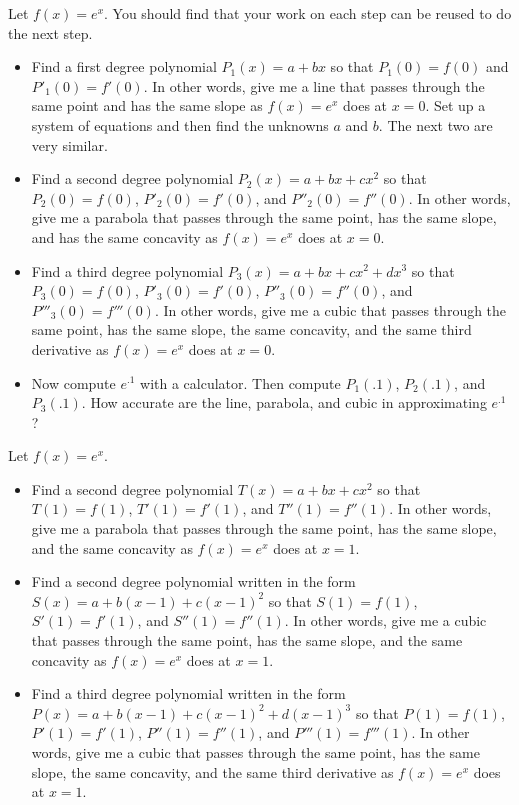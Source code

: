 \begin{problem} 
Let $f(x)=e^x$. You should find that your work on each step can be reused to do the next step.
\begin{itemize}
\item Find a first degree polynomial $P_1(x)=a+bx$ so that $P_1(0)=f(0)$ and $P'_1(0)=f'(0)$. In other words, give me a line that passes through the same point and has the same slope as $f(x)=e^x$ does at $x=0$. Set up a system of equations and then find the unknowns $a$ and $b$. The next two are very similar.
\item Find a second degree polynomial $P_2(x)=a+bx+cx^2$ so that $P_2(0)=f(0)$, $P'_2(0)=f'(0)$, and $P''_2(0)=f''(0)$. In other words, give me a parabola that passes through the same point, has the same slope, and has the same concavity as $f(x)=e^x$ does at $x=0$. 
\item Find a third degree polynomial $P_3(x)=a+bx+cx^2+dx^3$ so that $P_3(0)=f(0)$, $P'_3(0)=f'(0)$, $P''_3(0)=f''(0)$, and $P'''_3(0)=f'''(0)$. In other words, give me a cubic that passes through the same point, has the same slope, the same concavity, and the same third derivative as $f(x)=e^x$ does at $x=0$. 
\item Now compute $e^{.1}$ with a calculator.  Then compute $P_1(.1)$, $P_2(.1)$, and $P_3(.1)$. How accurate are the line, parabola, and cubic in approximating $e^{.1}$?
\end{itemize}
\end{problem} 

\begin{problem} \label{Taylor at 1}
Let $f(x)=e^x$.
\begin{itemize}
\item Find a second degree polynomial $T(x)=a+bx+cx^2$ so that $T(1)=f(1)$, $T'(1)=f'(1)$, and $T''(1)=f''(1)$. In other words, give me a parabola that passes through the same point, has the same slope, and the same concavity as $f(x)=e^x$ does at $x=1$. 
\item Find a second degree polynomial written in the form $S(x)=a+b(x-1)+c(x-1)^2$ so that $S(1)=f(1)$, $S'(1)=f'(1)$, and $S''(1)=f''(1)$. In other words, give me a cubic that passes through the same point, has the same slope, and the same concavity as $f(x)=e^x$ does at $x=1$. 
\item Find a third degree polynomial written in the form $P(x)=a+b(x-1)+c(x-1)^2+d(x-1)^3$ so that $P(1)=f(1)$, $P'(1)=f'(1)$, $P''(1)=f''(1)$, and $P'''(1)=f'''(1)$. In other words, give me a cubic that passes through the same point, has the same slope, the same concavity, and the same third derivative as $f(x)=e^x$ does at $x=1$. 
\end{itemize}
\end{problem} 


